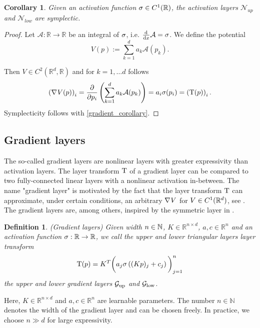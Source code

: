 \documentclass[twoside,a4paper]{article}
\newtheorem{definition}{Definition}
\newtheorem{corollary}{Corollary}
\begin{document}
\begin{corollary}
	Given an activation function $\sigma \in C^1(\mathbb{R})$,
	the activation layers $\mathcal{N}_{up}$ and $\mathcal{N}_{low}$ are symplectic.
\end{corollary}
\begin{proof}
	Let $\mathcal{A}: \mathbb{R} \to \mathbb{R}$ be an integral of $\sigma$, 
	i.e. $\frac{\mathrm{d}^{}}{\mathrm{d}x} \mathcal{A} = \sigma$. We define the potential
	\begin{equation*}
		V(p) := \sum_{k=1}^d a_k \mathcal{A}(p_k)
		.
	\end{equation*}

	Then $V \in C^2(\mathbb{R}^d, \mathbb{R})$ and for $k=1, \dots d$ follows
	\begin{equation*}
		\left( \nabla_{}{V}(p) \right)_i = \frac{\partial }{\partial p_i} \left( \sum_{k=1}^d a_k \mathcal{A}(p_k) \right)
		= a_i \sigma(p_i) = \left( \mathrm{T}(p) \right)_i
		.
	\end{equation*}
	Symplecticity follows with \cref{gradient_corollary}.
\end{proof}

\subsection{Gradient layers}

The so-called gradient layers are nonlinear layers with
greater expressivity than activation layers. The layer transform $\mathrm{T}$
of a gradient layer can be compared to two fully-connected linear layers with a
nonlinear activation in-between. The name "gradient layer" is
motivated by the fact that the layer transform $\mathrm{T}$ can approximate,
under certain conditions, an arbitrary $\nabla_{}{V}$ for $V \in C^1(\mathbb{R}^d)$, 
see \citet[Lemma 4]{Jin2020}. The gradient layers are, among others, inspired
by the symmetric layer in \citet{Ruthotto2020}.

\begin{definition}
	(Gradient layers)
	Given width $n \in \mathbb{N}$, $K \in \mathbb{R}^{n \times d}$, $a,c \in \mathbb{R}^n$ and
	an activation function $\sigma : \mathbb{R} \to \mathbb{R}$,
	we call the upper and lower triangular layers layer transform
	\begin{equation*}
		\mathrm{T}(p) = K^T \bigg( a_j \sigma \left( (Kp)_j + c_j \right) \bigg)_{j=1}^n
	\end{equation*}
	the upper and lower gradient layers $\mathcal{G}_{\text{up}}$ and $\mathcal{G}_{\text{low}}$.
\end{definition}
Here, $K \in \mathbb{R}^{n \times d}$ and $a,c \in \mathbb{R}^n$
are learnable parameters. 
The number $n \in \mathbb{N}$ denotes the width of the gradient layer and can be chosen freely.
In practice, we choose $n \gg d$ for large expressivity.
\end{document}
